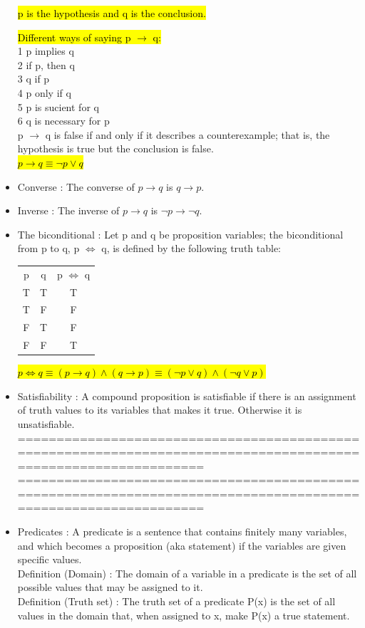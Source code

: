 \documentclass{article}
\begin{document}
\begin{itemize}
\hl{p is the hypothesis and q is the conclusion.}

\hl{Different ways of saying p $\rightarrow$ q:}\\
1 p implies q\\
2 if p, then q\\
3 q if p\\
4 p only if q\\
5 p is sucient for q\\
6 q is necessary for p\\

p $\rightarrow$ q is false if and only if it describes a counterexample;
that is, the hypothesis is true but the conclusion is false.\\

\hl{$p \rightarrow q \equiv \neg p \lor q$}

\item Converse : The converse of $p \rightarrow q$ is $q \rightarrow p.$ 

\item Inverse : The inverse of $p \rightarrow q$ is $ \neg p \rightarrow \neg q.$

\item The biconditional :  Let p and q be proposition variables; the biconditional from p to q,
p $\Leftrightarrow $ q, is defined by the following truth table:\\

\begin{tabular}{ccc}
  p & q & p $\Leftrightarrow$ q \\
  T & T & T \\
  T & F & F \\
  F & T & F \\
  F & F & T \\
\end{tabular}

\hl{$p \Leftrightarrow q \equiv (p \rightarrow q) \land (q \rightarrow p) \equiv (\neg p \lor q) \land  (\neg q \lor p)$}

\item Satisfiability : A compound proposition is satisfiable if there is an assignment of truth
values to its variables that makes it true. Otherwise it is unsatisfiable.\\

================================================================================================================
\newpage
================================================================================================================

\item Predicates : A predicate is a sentence that contains finitely many variables, and which
becomes a proposition (aka statement) if the variables are given specific
values.\\
Definition (Domain) : The domain of a variable in a predicate is the set of all possible values that
may be assigned to it.\\
Definition (Truth set) :
The truth set of a predicate P(x) is the set of all values in the domain
that, when assigned to x, make P(x) a true statement.

\end{itemize}
\end{document}
